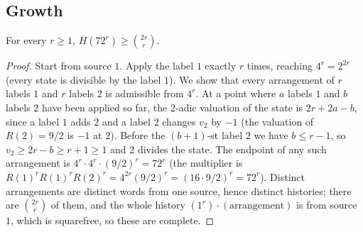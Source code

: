\subsection{Growth}
\begin{proposition}\label{prop:growth}
For every $r\ge1$, $H(72^r)\ge\binom{2r}{r}$.
\end{proposition}
\begin{proof}
Start from source $1$. Apply the label $1$ exactly $r$ times, reaching $4^r=2^{2r}$ (every state is divisible by the label $1$). We show that every arrangement of $r$ labels $1$ and $r$ labels $2$ is admissible from $4^r$. At a point where $a$ labels $1$ and $b$ labels $2$ have been applied so far, the $2$-adic valuation of the state is $2r+2a-b$, since a label $1$ adds $2$ and a label $2$ changes $v_2$ by $-1$ (the valuation of $R(2)=9/2$ is $-1$ at $2$). Before the $(b+1)$-st label $2$ we have $b\le r-1$, so $v_2\ge 2r-b\ge r+1\ge1$ and $2$ divides the state. The endpoint of any such arrangement is $4^r\cdot4^r\cdot(9/2)^r=72^r$ (the multiplier is $R(1)^rR(1)^rR(2)^r=4^{2r}(9/2)^r=(16\cdot9/2)^r=72^r$). Distinct arrangements are distinct words from one source, hence distinct histories; there are $\binom{2r}{r}$ of them, and the whole history $(1^r)\cdot(\text{arrangement})$ is from source $1$, which is squarefree, so these are complete.
\end{proof}

